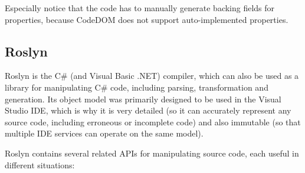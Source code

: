 Especially notice that the code has to manually generate backing fields for properties, because CodeDOM does not support auto-implemented properties.

\subsection{Roslyn}

Roslyn \cite{roslyn} is the C\# (and Visual Basic .NET) compiler, which can also be used as a library for manipulating C\# code, including parsing, transformation and generation. Its object model was primarily designed to be used in the Visual Studio \ac{IDE}, which is why it is very detailed (so it can accurately represent any source code, including erroneous or incomplete code) and also immutable (so that multiple \ac{IDE} services can operate on the same model).

Roslyn contains several related \acp{API} for manipulating source code, each useful in different situations:

